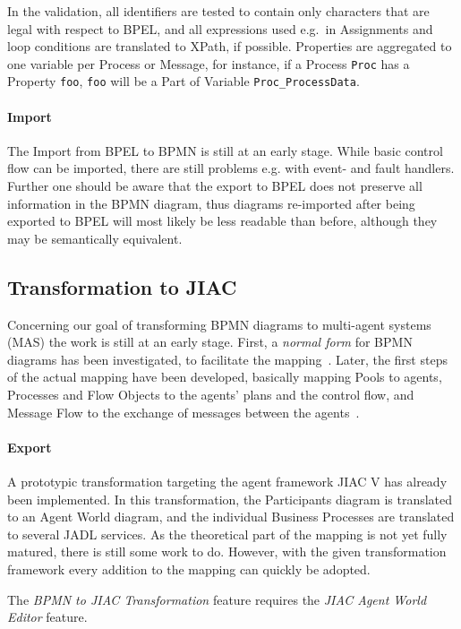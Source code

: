 In the validation, all identifiers are tested to contain only characters that are
legal with respect to BPEL, and all expressions used e.g.\ in Assignments and
loop conditions are translated to XPath, if possible.  Properties are aggregated
to one variable per Process or Message, for instance, if a Process \texttt{Proc}
has a Property \texttt{foo}, \texttt{foo} will be a Part of Variable
\texttt{Proc\_ProcessData}.

\paragraph{Import}
The Import from BPEL to BPMN is still at an early stage.  While basic control
flow can be imported, there are still problems e.g. with event- and fault handlers.
Further one should be aware that the export to BPEL does not preserve all
information in the BPMN diagram, thus diagrams re-imported after being exported
to BPEL will most likely be less readable than before, although they may be
semantically equivalent.


\subsection{Transformation to JIAC}
\label{sec:user_trafo_jiac}

Concerning our goal of transforming BPMN diagrams to multi-agent systems (MAS)
the work is still at an early stage.  First, a \emph{normal form} for BPMN diagrams
has been investigated, to facilitate the mapping~\cite{endert2007towards}.  Later,
the first steps of the actual mapping have been developed, basically mapping Pools
to agents, Processes and Flow Objects to the agents' plans and the control flow,
and Message Flow to the exchange of messages between the agents~\cite{endert2007mapping}.

\paragraph{Export}
A prototypic transformation targeting the agent framework JIAC V has already been
implemented.  In this transformation, the Participants diagram is translated to
an Agent World diagram, and the individual Business Processes are translated to
several JADL services.  As the theoretical part of the mapping is not yet fully
matured, there is still some work to do.  However, with the given transformation
framework every addition to the mapping can quickly be adopted.

The \emph{BPMN to JIAC Transformation} feature requires the \emph{JIAC Agent World
Editor} feature.


